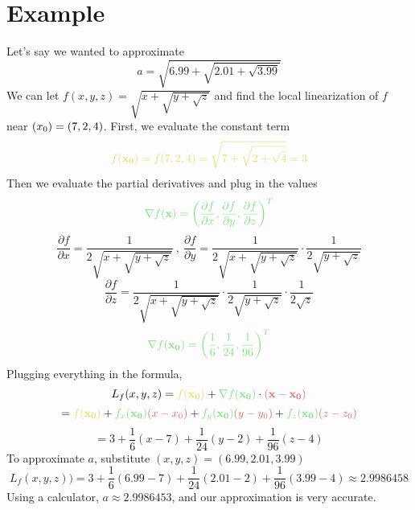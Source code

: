 \documentclass[10pt]{article}
\begin{document}
\section{Example}
\large{Let's say we wanted to approximate $$a=\sqrt{6.99+\sqrt{2.01+\sqrt{3.99}}}$$We can let $f(x,y,z)=\sqrt{x+\sqrt{y+\sqrt{z}}}$ and find the local linearization of $f$ near $\bold(x_0)=(7,2,4)$. First, we evaluate the constant term $$\textcolor{myyellow}{f(\bold{x_0})=f(7,2,4)=\sqrt{7+\sqrt{2+\sqrt{4}}}=3}$$Then we evaluate the partial derivatives and plug in the values
$$\textcolor{mygreen}{\nabla f(\bold{x})=\left(\frac{\partial f}{\partial x},\frac{\partial f}{\partial y},\frac{\partial f}{\partial z}\right)^T}$$$$\frac{\partial f}{\partial x}=\frac{1}{2\sqrt{x+\sqrt{y+\sqrt{z}}}}\:,\:\frac{\partial f}{\partial y}=\frac{1}{2\sqrt{x+\sqrt{y+\sqrt{z}}}}\cdot\frac{1}{2\sqrt{y+\sqrt{z}}}$$$$\frac{\partial f}{\partial z}=\frac{1}{2\sqrt{x+\sqrt{y+\sqrt{z}}}}\cdot\frac{1}{2\sqrt{y+\sqrt{z}}}\cdot\frac{1}{2\sqrt{z}}$$$$\textcolor{mygreen}{\nabla f(\bold{x_0})=\left(\frac{1}{6},\frac{1}{24},\frac{1}{96}\right)^T}$$Plugging everything in the formula,$$L_f(x,y,z)=\textcolor{myyellow}{f(\bold{x_0})}+\textcolor{mygreen}{\nabla f(\bold{x_0})}\cdot\textcolor{myred}{ (\bold{x}-\bold{x_0})}$$$$=\textcolor{myyellow}{f(\bold{x_0})}+\textcolor{mygreen}{f_x(\bold{x_0})}\textcolor{myred}{(x-x_0)}+\textcolor{mygreen}{f_y(\bold{x_0})}\textcolor{myred}{(y-y_0)}+\textcolor{mygreen}{f_z(\bold{x_0})}\textcolor{myred}{(z-z_0)}$$$$=3+\frac{1}{6}(x-7)+\frac{1}{24}(y-2)+\frac{1}{96}(z-4)$$To approximate $a$, substitute $(x,y,z)=(6.99,2.01,3.99)$ $$L_f(x,y,z))=3+\frac{1}{6}(6.99-7)+\frac{1}{24}(2.01-2)+\frac{1}{96}(3.99-4)\approx2.9986458$$Using a calculator, $a\approx2.9986453$, and our approximation is very accurate.}
\end{document}
